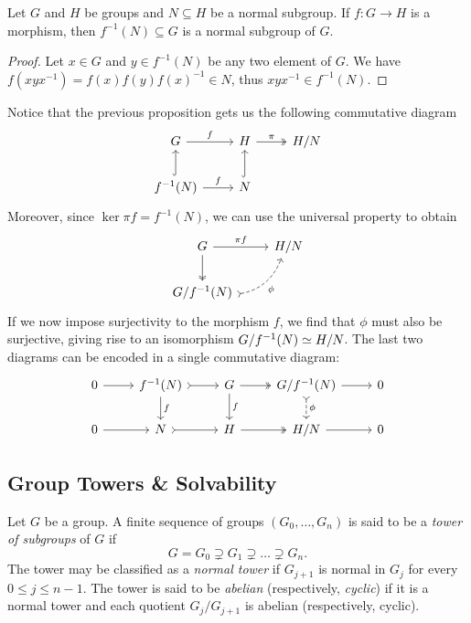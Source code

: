 \begin{proposition}
\label{prop:morphisms-preserve-normality}
Let \(G\) and \(H\) be groups and \(N \subseteq H\) be a normal subgroup. If
\(f: G \to H\) is a morphism, then \(f^{-1}(N) \subseteq G\) is a normal
subgroup of \(G\).
\end{proposition}

\begin{proof}
Let \(x \in G\) and \(y \in f^{-1}(N)\) be any two element of \(G\). We have
\(f(x y x^{-1}) = f(x) f(y) f(x)^{-1} \in N\), thus \(x y x^{-1} \in f^{-1}(N)\).
\end{proof}

Notice that the previous proposition gets us the following commutative diagram
\[
  \begin{tikzcd}
    G \ar[r, "f"] &H \ar[r, two heads, "\pi"] &H/N \\
    f^{-1}(N) \ar[u, hook] \ar[r, "f"] &N \ar[u, hook]
  \end{tikzcd}
\]
Moreover, since \(\ker \pi f = f^{-1}(N)\), we can use the universal property to
obtain
\[
  \begin{tikzcd}
    G \ar[d, two heads] \ar[r, "\pi f"] &H/N \\
    G/f^{-1}(N) \ar[ru, swap, tail, bend right, dashed, "\phi"] &
  \end{tikzcd}
\]
If we now impose surjectivity to the morphism \(f\), we find that \(\phi\) must
also be surjective, giving rise to an isomorphism \(G/f^{-1}(N) \simeq H/N\). The
last two diagrams can be encoded in a single commutative diagram:
\[
  \begin{tikzcd}
    0 \ar[r]
    &f^{-1}(N) \ar[d, "f"] \ar[r, tail]
    &G \ar[d, "f"] \ar[r, two heads]
    &G/f^{-1}(N) \ar[r] \ar[d, dashed, tail, "\phi"]
    &0 \\
    0 \ar[r]
    &N \ar[r, tail]
    &H \ar[r, two heads]
    &H/N \ar[r]
    &0
  \end{tikzcd}
\]

\subsection{Group Towers \& Solvability}

\begin{definition}
\label{def:tower-subgroups}
Let \(G\) be a group. A finite sequence of groups \((G_0, \dots, G_n)\) is said
to be a \emph{tower of subgroups} of \(G\) if
\[
  G = G_0 \supsetneq G_1 \supsetneq \dots \supsetneq G_n.
\]
The tower may be classified as a \emph{normal tower} if \(G_{j + 1}\) is normal
in \(G_j\) for every \(0 \leq j \leq n - 1\). The tower is said to be
\emph{abelian} (respectively, \emph{cyclic}) if it is a normal tower and each
quotient \(G_j/G_{j+1}\) is abelian (respectively, cyclic).
\end{definition}

